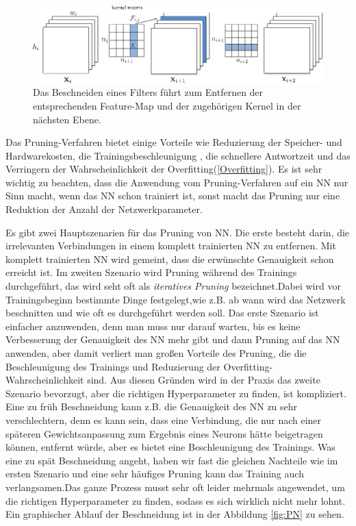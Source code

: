 \documentclass[12pt,a4paper]{scrartcl}
\numberwithin{equation}{section}
\begin{document}
\begin{itemize}
	\begin{figure}[h]
	\centering
	
	\includegraphics[scale=.75, width=\textwidth]{filter_pruning}
	\caption{ Das Beschneiden eines Filters führt zum Entfernen der entsprechenden Feature-Map und der zugehörigen Kernel in der nächsten Ebene\cite{Filter Pruning}.}
	\label{fig:Filter_pruning}
\end{figure}

\end{itemize}


Das Pruning-Verfahren bietet einige Vorteile wie Reduzierung der Speicher- und Hardwarekosten, die Trainingsbeschleunigung , die schnellere Antwortzeit und das Verringern der Wahrscheinlichkeit der Overfitting(\ref{Overfitting}).
Es ist sehr wichtig zu beachten, dass die Anwendung vom Pruning-Verfahren auf ein \ac{NN} nur Sinn macht, wenn das \ac{NN} schon trainiert ist, sonst macht das Pruning nur eine Reduktion der Anzahl der Netzwerkparameter.

Es gibt zwei Hauptszenarien für das Pruning von \ac{NN}.
Die erste besteht darin, die irrelevanten Verbindungen in einem komplett trainierten \ac{NN} zu entfernen. Mit komplett trainierten \ac{NN} wird gemeint, dass die erwünschte Genauigkeit schon erreicht ist. Im zweiten Szenario wird Pruning während des Trainings durchgeführt, das wird seht oft als \textit{iteratives Pruning} bezeichnet.Dabei wird vor Trainingsbeginn  bestimmte Dinge festgelegt,wie z.B. ab wann wird das Netzwerk beschnitten und wie oft es durchgeführt werden soll. 
Das erste Szenario ist einfacher anzuwenden, denn man muss nur darauf warten, bis es keine Verbesserung der Genauigkeit des \ac{NN} mehr gibt und dann Pruning auf das \ac{NN} anwenden, aber damit verliert man großen Vorteile des Pruning, die die Beschleunigung des Trainings und Reduzierung der Overfitting-Wahrscheinlichkeit sind.
Aus diesen Gründen wird in der Praxis das zweite Szenario bevorzugt, aber die richtigen Hyperparameter zu finden, ist kompliziert. Eine zu früh Beschneidung kann z.B. die Genauigkeit des \ac{NN} zu sehr verschlechtern, denn es kann sein, dass eine Verbindung, die nur nach einer späteren Gewichtsanpassung zum Ergebnis eines Neurons  hätte beigetragen können, entfernt würde, aber es bietet eine Beschleunigung des Trainings. Was eine zu spät Beschneidung angeht, haben wir fast die gleichen Nachteile wie im ersten Szenario und eine sehr häufiges Pruning kann das Training  auch verlangsamen.Das ganze Prozess musst sehr oft leider mehrmals angewendet, um die richtigen Hyperparameter zu finden, sodass es sich wirklich nicht mehr lohnt. Ein graphischer Ablauf der Beschneidung ist in der Abbildung \ref{fig:PN} zu sehen.
\end{document}
